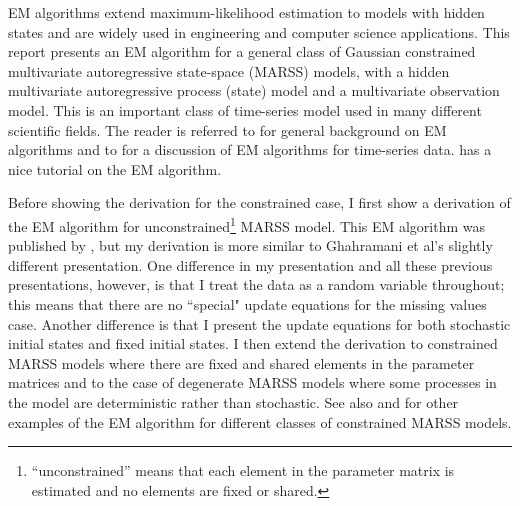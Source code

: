 \documentclass[]{article}
\begin{document}
EM algorithms extend maximum-likelihood estimation to models with hidden states and are widely used in engineering and computer science applications. This report presents an EM algorithm for a general class of Gaussian constrained multivariate autoregressive state-space (MARSS) models, with a hidden multivariate autoregressive process (state) model and a multivariate observation model.  This is an important class of time-series model used in many different scientific fields. The reader is referred to \citet{McLachlanKrishnan2008} for general background on EM algorithms and to \citet{Harvey1989} for a discussion of EM algorithms for time-series data.  \citet{Borman2009} has a nice tutorial on the EM algorithm.  

Before showing the derivation for the constrained case, I first show a derivation of the EM algorithm  for unconstrained\footnote{``unconstrained'' means that each element in the parameter matrix is estimated and no elements are fixed or shared.} MARSS model. This EM algorithm was published by \citet{ShumwayStoffer1982}, but my derivation is more similar to Ghahramani et al's \citep{GhahramaniHinton1996, RoweisGhahramani1999} slightly different presentation.  One difference in my presentation and all these previous presentations, however, is that I treat the data as a random variable throughout; this means that there are no ``special" update equations for the missing values case.  Another difference is that I present the update equations for both stochastic initial states and fixed initial states.  I then extend the derivation to constrained MARSS models where there are fixed and shared elements in the parameter matrices and to the case of degenerate MARSS models where some processes in the model are deterministic rather than stochastic. See also \citet{Wuetal1996} and \citet{Zuuretal2003a} for other examples of the EM algorithm for different classes of constrained MARSS models.
\end{document}
